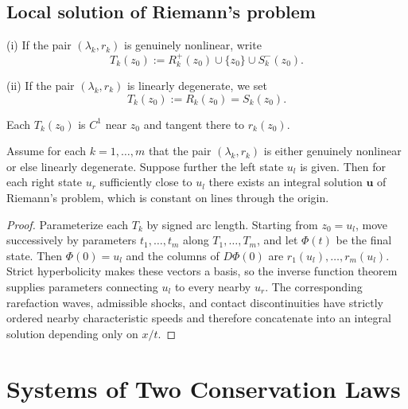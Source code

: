\subsection{Local solution of Riemann's problem}\label{sec:local-solution-riemanns-problem}

\begin{definition}
\label{def:t-curve}
(i) If the pair $(\lambda_k, r_k)$ is genuinely nonlinear, write
$$T_k(z_0) := R_k^+(z_0) \cup \{z_0\} \cup S_k^-(z_0).$$

(ii) If the pair $(\lambda_k, r_k)$ is linearly degenerate, we set
$$T_k(z_0) := R_k(z_0) = S_k(z_0).$$
\end{definition}

Each $T_k(z_0)$ is $C^1$ near $z_0$ and tangent there to $r_k(z_0)$.

\begin{theorem}
\label{thm:local-solution-riemann-problem}
Assume for each $k=1,\ldots,m$ that the pair $(\lambda_k, r_k)$ is either genuinely nonlinear or else linearly degenerate. Suppose further the left state $u_l$ is given. Then for each right state $u_r$ sufficiently close to $u_l$ there exists an integral solution $\mathbf{u}$ of Riemann's problem, which is constant on lines through the origin.
\end{theorem}

\begin{proof}
\sketch Parameterize each $T_k$ by signed arc length. Starting from $z_0=u_l$, move successively by parameters $t_1,\ldots,t_m$ along $T_1,\ldots,T_m$, and let $\Phi(t)$ be the final state. Then $\Phi(0)=u_l$ and the columns of $D\Phi(0)$ are $r_1(u_l),\ldots,r_m(u_l)$. Strict hyperbolicity makes these vectors a basis, so the inverse function theorem supplies parameters connecting $u_l$ to every nearby $u_r$. The corresponding rarefaction waves, admissible shocks, and contact discontinuities have strictly ordered nearby characteristic speeds and therefore concatenate into an integral solution depending only on $x/t$.
\end{proof}

\section{Systems of Two Conservation Laws}\label{sec:systems-two-conservation-laws}

